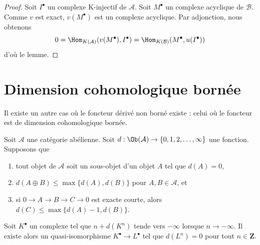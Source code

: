 \begin{proof}
Soit $I^\bullet$ un complexe K-injectif de $\mathcal{A}$.
Soit $M^\bullet$ un complexe acyclique de $\mathcal{B}$.
Comme $v$ est exact, $v(M^\bullet)$ est un complexe acyclique.
Par adjonction, nous obtenons
$$
0 = \Hom_{K(\mathcal{A})}(v(M^\bullet), I^\bullet) =
\Hom_{K(\mathcal{B})}(M^\bullet, u(I^\bullet))
$$
d'où le lemme.
\end{proof}

\section{Dimension cohomologique bornée}
\label{section-bounded}

\noindent
Il existe un autre cas où le foncteur dérivé non borné existe : celui où le
foncteur est de dimension cohomologique bornée.

\begin{lemma}
\label{lemma-replace-resolution}
Soit $\mathcal{A}$ une catégorie abélienne. Soit
$d : \Ob(\mathcal{A}) \to \{0, 1, 2, \ldots, \infty\}$ une fonction.
Supposons que
\begin{enumerate}
\item tout objet de $\mathcal{A}$ soit un sous-objet d'un objet $A$ tel que
$d(A) = 0$,
\item $d(A \oplus B) \leq \max \{d(A), d(B)\}$ pour
$A, B \in \mathcal{A}$, et
\item si $0 \to A \to B \to C \to 0$ est exacte courte, alors
$d(C) \leq \max\{d(A) - 1, d(B)\}$.
\end{enumerate}
Soit $K^\bullet$ un complexe tel que $n + d(K^n)$ tende vers $-\infty$
lorsque $n \to -\infty$. Il existe alors un quasi-isomorphisme
$K^\bullet \to L^\bullet$ tel que $d(L^n) = 0$ pour tout
$n \in \mathbf{Z}$.
\end{lemma}

